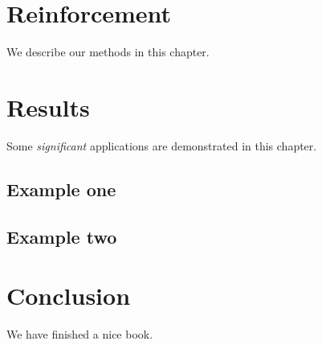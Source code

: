 \documentclass[
]{book}
\begin{document}
\hypertarget{reinforcement}{%
\chapter{Reinforcement}\label{reinforcement}}

We describe our methods in this chapter.

\hypertarget{results}{%
\chapter{Results}\label{results}}

Some \emph{significant} applications are demonstrated in this chapter.

\hypertarget{example-one}{%
\section{Example one}\label{example-one}}

\hypertarget{example-two}{%
\section{Example two}\label{example-two}}

\hypertarget{conclusion}{%
\chapter{Conclusion}\label{conclusion}}

We have finished a nice book.
\end{document}
